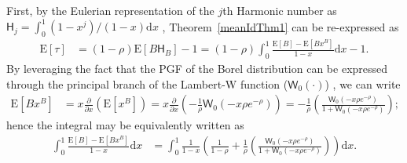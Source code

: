 \documentclass[opre,nonblindrev]{informs3_no_remark}
\newcommand{\E}[1]{{\mathrm{E}\left[#1\right]}}
\begin{document}
 First, by the Eulerian representation of the $j$th Harmonic number as $\mathsf{H}_j = \int_0^1 (1-x^j)/(1-x) \mathrm{d}x$ \citep[e.g.,][sec. 2.2]{lagarias2013euler}, Theorem~\ref{meanIdThm1} can be re-expressed as
\begin{align}
\E{\tau}
&=
(1-\rho)\E{B \mathsf{H}_B} - 1
=
(1-\rho)\int_0^1\frac{\E{B} - \E{B x^B}}{1-x}\mathrm{d}x
-
1
.
\end{align}
By leveraging the fact that the PGF of the Borel distribution can be expressed through the principal branch of the Lambert-W function ($\mathsf{W}_0(\cdot)$) \citep[e.g.,][eq. 3.1]{corless1996lambert}, we can write
\begin{align}
\E{B x^B}
&=
x \frac{\partial}{\partial x}
\left(
\E{x^B}
\right)
=
x \frac{\partial}{\partial x}
\left(
-\frac{1}{\rho}\mathsf{W}_0\left(-x \rho e^{-\rho}\right)
\right)
=
-
\frac{1}{\rho}
\left(
\frac{\mathsf{W}_0\left(-x \rho e^{-\rho}\right)}
{1 + \mathsf{W}_0\left(-x \rho e^{-\rho}\right)}
\right)
;
\end{align}
hence the integral may be equivalently written as
\begin{align}
\int_0^1\frac{\E{B} - \E{B x^B}}{1-x}\mathrm{d}x
&=
\int_0^1\frac{1}{1-x}\left(\frac{1}{1-\rho} +  \frac{1}{\rho}
\left(
\frac{\mathsf{W}_0\left(-x \rho e^{-\rho}\right)}
{1 + \mathsf{W}_0\left(-x \rho e^{-\rho}\right)}
\right)\right)\mathrm{d}x
.
\end{align}
\end{document}
